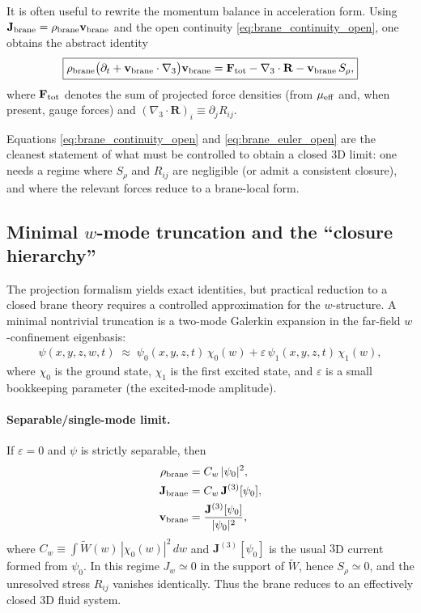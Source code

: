 \documentclass[11pt]{article}
\begin{document}
It is often useful to rewrite the momentum balance in acceleration form.  Using
$\mathbf{J}_{\rm brane}=\rho_{\rm brane}\mathbf{v}_{\rm brane}$ and the open
continuity \eqref{eq:brane_continuity_open}, one obtains the abstract identity
\begin{align}
\boxed{
\rho_{\rm brane}\big(\partial_t + \mathbf{v}_{\rm brane}\cdot\nabla_3\big)\mathbf{v}_{\rm brane}
=
\mathbf{F}_{\rm tot}
-\nabla_3\cdot \mathbf{R}
-\mathbf{v}_{\rm brane}\,S_\rho,
}
\label{eq:brane_euler_open}
\end{align}
where $\mathbf{F}_{\rm tot}$ denotes the sum of projected force densities (from
$\mu_{\rm eff}$ and, when present, gauge forces) and $(\nabla_3\cdot \mathbf{R})_i
\equiv \partial_j R_{ij}$.

Equations \eqref{eq:brane_continuity_open} and \eqref{eq:brane_euler_open} are
the cleanest statement of what must be controlled to obtain a closed 3D limit:
one needs a regime where $S_\rho$ and $R_{ij}$ are negligible (or admit a
consistent closure), and where the relevant forces reduce to a brane-local form.

\subsection{Minimal $w$-mode truncation and the ``closure hierarchy''}
\label{sec:w_mode_truncation}

The projection formalism yields exact identities, but practical reduction to a
closed brane theory requires a controlled approximation for the $w$-structure.
A minimal nontrivial truncation is a two-mode Galerkin expansion in the
far-field $w$-confinement eigenbasis:
\begin{align}
\psi(x,y,z,w,t) \;\approx\;
\psi_0(x,y,z,t)\,\chi_0(w) + \varepsilon\,\psi_1(x,y,z,t)\,\chi_1(w),
\label{eq:two_mode_ansatz}
\end{align}
where $\chi_0$ is the ground state, $\chi_1$ is the first excited state, and
$\varepsilon$ is a small bookkeeping parameter (the excited-mode amplitude).

\paragraph{Separable/single-mode limit.}
If $\varepsilon=0$ and $\psi$ is strictly separable, then
\begin{align}
\rho_{\rm brane} &= C_w\,|\psi_0|^2,\\
\mathbf{J}_{\rm brane} &= C_w\,\mathbf{J}^{(3)}[\psi_0],\\
\mathbf{v}_{\rm brane} &= \frac{\mathbf{J}^{(3)}[\psi_0]}{|\psi_0|^2},
\end{align}
where $C_w\equiv\int \widetilde W(w)\,|\chi_0(w)|^2\,dw$ and
$\mathbf{J}^{(3)}[\psi_0]$ is the usual $3$D current formed from $\psi_0$.
In this regime $J_w\simeq 0$ in the support of $\widetilde W$, hence $S_\rho\simeq 0$,
and the unresolved stress $R_{ij}$ vanishes identically.  Thus the brane
reduces to an effectively closed $3$D fluid system.
\end{document}
